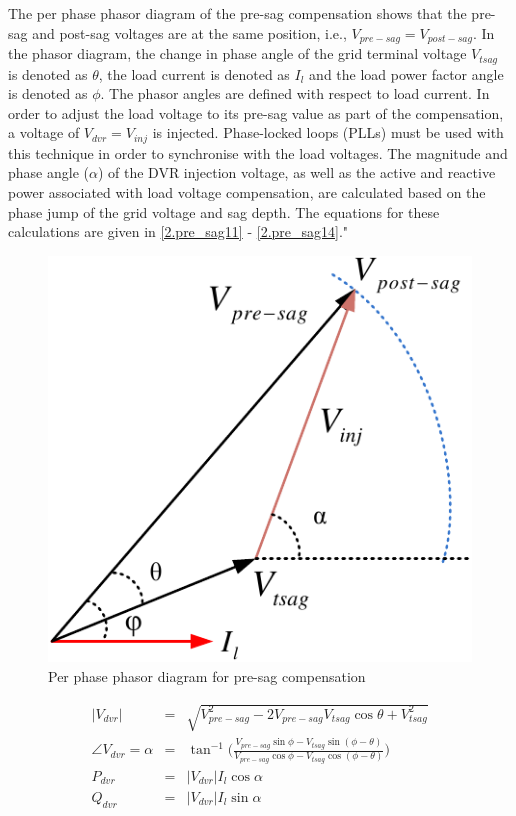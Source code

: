 The per phase phasor diagram of the pre-sag compensation shows that the pre-sag and post-sag voltages are at the same position, i.e., $V_{pre-sag} = V_{post-sag}$. In the phasor diagram, the change in phase angle of the grid terminal voltage $V_{tsag}$ is denoted as $\theta$, the load current is denoted as $I_{l}$ and the load power factor angle is denoted as $\phi$. The phasor angles are defined with respect to load current.  In order to adjust the load voltage to its pre-sag value as part of the compensation, a voltage of $V_{dvr} = V_{inj}$ is injected. Phase-locked loops (PLLs) must be used with this technique in order to synchronise with the load voltages. The magnitude and phase angle ($\alpha$) of the DVR injection voltage, as well as the active and reactive power associated with load voltage compensation, are calculated based on the phase jump of the grid voltage and sag depth. The equations for these calculations are given in \eqref{2.pre_sag11} - \eqref{2.pre_sag14}."
\vspace*{-1.2cm}
\begin{figure}[h!]
	\centering
   \includegraphics[scale=0.85]{figures/Chapter_1_2/c2_pre_sag}
   \caption{Per phase phasor diagram for pre-sag compensation \cite{ManikPradhan}}
   \label{2.pre_sag}
\end{figure}
\vspace*{-1.5cm}
\begin{eqnarray}
\label{2.pre_sag10}
\left|V_{dvr}\right| &=& \sqrt{V^{2}_{pre-sag}-2V^{}_{pre-sag}V^{}_{tsag}\cos\theta+V^{2}_{tsag}} \label{2.pre_sag11}\\
\angle V_{dvr} = \alpha &=&\tan^{-1}\bigg(\frac{V_{pre-sag}\sin\phi - V_{tsag}\sin (\phi - \theta)}{V_{pre-sag} \cos \phi -V_{tsag}\cos (\phi - \theta) } \label{2.pre_sag12}\bigg)\\
 P_{dvr} &=& \left|V_{dvr}\right| I_{l}\cos \alpha\label{2.pre_sag13}\\
 Q_{dvr} &=& \left|V_{dvr}\right| I_{l}\sin \alpha\label{2.pre_sag14}
\end{eqnarray} 

